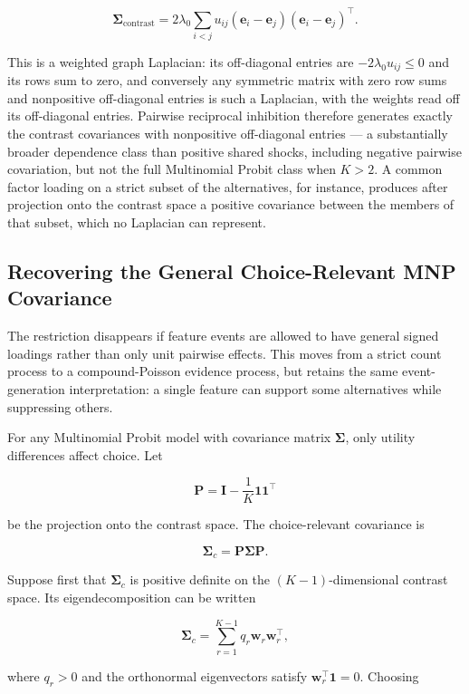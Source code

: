 \documentclass[
  man,
  floatsintext,
  longtable,
  a4paper,
  nolmodern,
  notxfonts,
  notimes,
  colorlinks=true,linkcolor=blue,citecolor=blue,urlcolor=blue]{apa7}
\begin{document}
\[
\boldsymbol\Sigma_{\mathrm{contrast}}
=
2\lambda_0
\sum_{i<j}
u_{ij}
(\mathbf e_i-\mathbf e_j)
(\mathbf e_i-\mathbf e_j)^\top.
\]

This is a weighted graph Laplacian: its off-diagonal entries are
\(-2\lambda_0 u_{ij}\leq 0\) and its rows sum to zero, and conversely
any symmetric matrix with zero row sums and nonpositive off-diagonal
entries is such a Laplacian, with the weights read off its off-diagonal
entries. Pairwise reciprocal inhibition therefore generates exactly the
contrast covariances with nonpositive off-diagonal entries --- a
substantially broader dependence class than positive shared shocks,
including negative pairwise covariation, but not the full Multinomial
Probit class when \(K>2\). A common factor loading on a strict subset of
the alternatives, for instance, produces after projection onto the
contrast space a positive covariance between the members of that subset,
which no Laplacian can represent.

\subsection{Recovering the General Choice-Relevant MNP
Covariance}\label{recovering-the-general-choice-relevant-mnp-covariance}

The restriction disappears if feature events are allowed to have general
signed loadings rather than only unit pairwise effects. This moves from
a strict count process to a compound-Poisson evidence process, but
retains the same event-generation interpretation: a single feature can
support some alternatives while suppressing others.

For any Multinomial Probit model with covariance matrix
\(\boldsymbol\Sigma\), only utility differences affect choice. Let

\[
\mathbf P
=
\mathbf I-\frac{1}{K}\mathbf 1\mathbf 1^\top
\]

be the projection onto the contrast space. The choice-relevant
covariance is

\[
\boldsymbol\Sigma_c
=
\mathbf P\boldsymbol\Sigma\mathbf P.
\]

Suppose first that \(\boldsymbol\Sigma_c\) is positive definite on the
\((K-1)\)-dimensional contrast space. Its eigendecomposition can be
written

\[
\boldsymbol\Sigma_c
=
\sum_{r=1}^{K-1}
q_r\mathbf w_r\mathbf w_r^\top,
\]

where \(q_r>0\) and the orthonormal eigenvectors satisfy
\(\mathbf w_r^\top\mathbf 1=0\). Choosing
\end{document}
